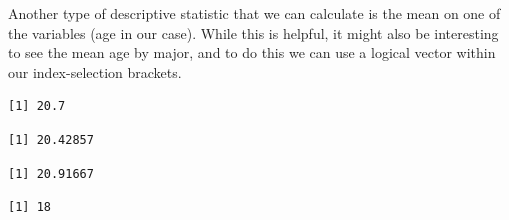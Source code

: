 \documentclass[
  letterpaper,
  DIV=11,
  numbers=noendperiod]{scrreprt}
\newenvironment{Shaded}{\begin{snugshade}}{\end{snugshade}}
\newcommand{\FunctionTok}[1]{\textcolor[rgb]{0.28,0.35,0.67}{#1}}
\newcommand{\NormalTok}[1]{\textcolor[rgb]{0.00,0.23,0.31}{#1}}
\newcommand{\SpecialCharTok}[1]{\textcolor[rgb]{0.37,0.37,0.37}{#1}}
\newcommand{\StringTok}[1]{\textcolor[rgb]{0.13,0.47,0.30}{#1}}
\begin{document}
Another type of descriptive statistic that we can calculate is the mean
on one of the variables (age in our case). While this is helpful, it
might also be interesting to see the mean age by major, and to do this
we can use a logical vector within our index-selection brackets.

\begin{Shaded}
\end{Shaded}

\begin{verbatim}
[1] 20.7
\end{verbatim}

\begin{Shaded}
\end{Shaded}

\begin{verbatim}
[1] 20.42857
\end{verbatim}

\begin{Shaded}
\end{Shaded}

\begin{verbatim}
[1] 20.91667
\end{verbatim}

\begin{Shaded}
\end{Shaded}

\begin{verbatim}
[1] 18
\end{verbatim}
\end{document}
